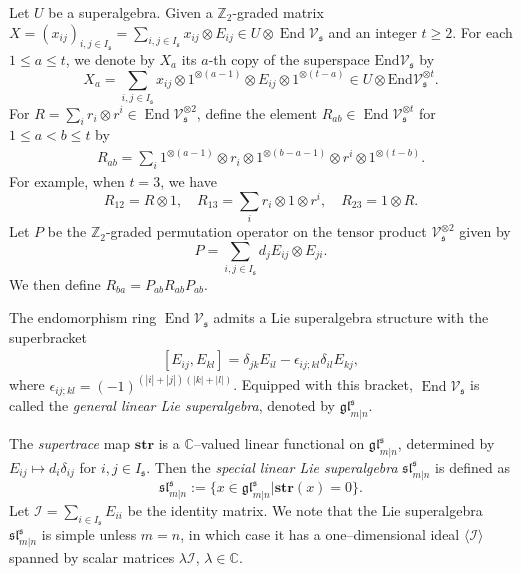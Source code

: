 \documentclass[a4paper,12pt]{article}
\numberwithin{equation}{section}
\begin{document}
Let $U$ be a superalgebra. Given a $\mathbb{Z}_2$-graded matrix
$X=(x_{ij})_{i,j\in I_{\mathfrak{s}}}=\sum_{i,j\in I_{\mathfrak{s}}} x_{ij} \otimes E_{ij}  \in U\otimes \operatorname{End}\mathcal{V}_{\mathfrak{s}}$ and an integer $t\geqslant 2$. 
For each $1\leqslant a\leqslant t$, we denote by $X_a$ its $a$-th copy of the superspace $\mathrm{End}\mathcal{V}_{\mathfrak{s}}$ by
$$
X_a=\sum\limits_{i,j\in I_{\mathfrak{s}}}x_{ij}\otimes 1^{\otimes (a-1)} \otimes E_{ij}\otimes 1^{\otimes (t-a)} \in U\otimes \mathrm{End}\mathcal{V}_{\mathfrak{s}}^{\otimes t}.
$$
For $R=\sum_i r_{i}\otimes r^{i}\in \operatorname{End}\mathcal{V}_{\mathfrak{s}}^{\otimes 2}$, define the element $R_{ab} \in \operatorname{End}\mathcal{V}_{\mathfrak{s}}^{\otimes t}$ for $1\leqslant a<b\leqslant t$ by
\begin{gather*}
    R_{ab}=\sum_{i} 1^{\otimes (a-1)}\otimes r_i\otimes 1^{\otimes (b-a-1)}\otimes r^i\otimes 1^{\otimes (t-b)}.
\end{gather*}
For example, when $t=3$, we have
$$
R_{12}=R\otimes 1, \quad R_{13}=\sum_{i} r_{i}\otimes 1 \otimes r^{i}, \quad R_{23}=1\otimes R.
$$
Let $P$ be the $\mathbb{Z}_2$-graded permutation operator on the tensor product $\mathcal{V}_{\mathfrak{s}}^{\otimes 2}$ given by
$$
P=\sum_{i,j\in I_{\mathfrak{s}}}d_{j}E_{ij}\otimes E_{ji}.
$$
We then define $R_{ba}=P_{ab} R_{ab}P_{ab}$.



The endomorphism ring $\operatorname{End}\mathcal{V}_{\mathfrak{s}}$ admits a Lie superalgebra structure with the superbracket
\begin{align*}
\left[E_{ij},E_{kl}\right]=\delta_{jk}E_{il}-\epsilon_{ij;kl}\delta_{il}E_{kj},
\end{align*}
where $\epsilon_{ij;kl}=(-1)^{(|i|+|j|)(|k|+|l|)}$. 
 Equipped with this bracket, $\operatorname{End}\mathcal{V}_{\mathfrak{s}}$ is called the \textit{general linear Lie superalgebra}, denoted by $\mathfrak{gl}_{m|n}^{\mathfrak{s}}$.

The \textit{supertrace} map $\mathbf{str}$ is a $\mathbb{C}$--valued linear functional on $\mathfrak{gl}_{m|n}^{\mathfrak{s}}$, determined by $E_{ij}\mapsto d_{i}\delta_{ij}$ for $i,j\in I_{\mathfrak{s}}$. Then the \textit{special linear Lie superalgebra} $\mathfrak{sl}_{m|n}^{\mathfrak{s}}$ is defined as
$$
\mathfrak{sl}_{m|n}^{\mathfrak{s}}:=\{x\in\mathfrak{gl}_{m|n}^{\mathfrak{s}}|\mathbf{str}(x)=0\}. 
$$
Let $\mathcal{I}=\sum_{i\in I_{\mathfrak{s}}}E_{ii}$ be the identity matrix.
We note that the Lie superalgebra $\mathfrak{sl}_{m|n}^{\mathfrak{s}}$ is simple unless $m=n$, in which case it has a one--dimensional ideal $\langle \mathcal{I}\rangle$ spanned by scalar matrices $\lambda \mathcal{I}$, $\lambda \in\mathbb{C}$.
\end{document}

